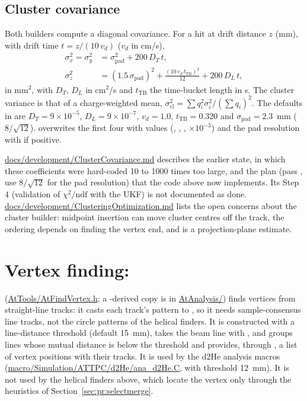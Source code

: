 \subsection{Cluster covariance}

Both builders compute a diagonal covariance. For a hit at drift distance $z$ (mm), with drift time
$t = z/(10\,v_d)$ ($v_d$ in cm/\textmu s),
\begin{align*}
\sigma^2_{x} = \sigma^2_{y} &= \sigma^2_\mathrm{pad} + 200\,D_T\,t, \\
\sigma^2_{z} &= (1.5\,\sigma_\mathrm{pad})^2 + \frac{(10\,v_d\,t_\mathrm{TB})^2}{12} + 200\,D_L\,t,
\end{align*}
in mm$^2$, with $D_T$, $D_L$ in cm$^2$/\textmu s and $t_\mathrm{TB}$ the time-bucket length in \textmu s.
The cluster variance is that of a charge-weighted mean, $\sigma^2_\mathrm{cl} = \sum q_i^2\sigma_i^2 /
(\sum q_i)^2$. The defaults in  are $D_T = 9\times10^{-5}$, $D_L =
9\times10^{-7}$, $v_d = 1.0$, $t_\mathrm{TB} = 0.320$ and $\sigma_\mathrm{pad} = 2.3$~mm ($8/\sqrt{12}$).
 overwrites the first four with  values
(, , ,
$\times10^{-3}$) and the pad resolution with  if positive.

\url{docs/development/ClusterCovariance.md} describes the earlier state, in which these coefficients were
hard-coded 10 to 1000 times too large, and the plan (pass , use $8/\sqrt{12}$ for the
pad resolution) that the code above now implements. Its Step 4 (validation of $\chi^2/\mathrm{ndf}$ with
the UKF) is not documented as done. \url{docs/development/ClusteringOptimization.md} lists the open
concerns about the cluster builder: midpoint insertion can move cluster centres off the track, the
ordering depends on finding the vertex end, and  is a projection-plane estimate.

\section{Vertex finding: }

 (\url{AtTools/AtFindVertex.h}; a -derived copy is in
\url{AtAnalysis/}) finds vertices from straight-line tracks: it casts each track's pattern to
, so it needs sample-consensus line tracks, not the circle patterns of the helical
finders. It is constructed with a line-distance
threshold (default 15~mm), takes the beam line with , and
 groups lines whose mutual distance is below the threshold and
provides, through , a list of vertex positions with their tracks. It is used by the
d2He analysis macros (\url{macro/Simulation/ATTPC/d2He/ana_d2He.C}, with threshold 12~mm). It is not used
by the helical finders above, which locate the vertex only through the heuristics of
Section~\ref{sec:pr:selectmerge}.

